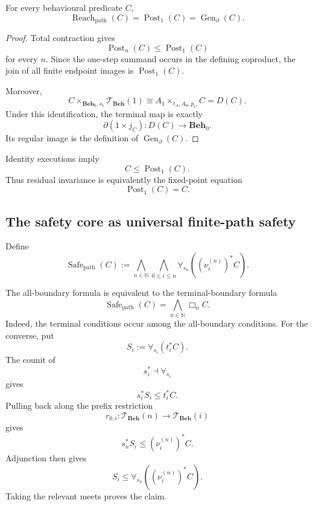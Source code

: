 \begin{theorem}
\label{thm:generated-closure-endpoint-reachability}
For every behavioural predicate \(C\),
\[
    \operatorname{Reach}_{\mathrm{path}}(C)
    =
    \operatorname{Post}_1(C)
    =
    \operatorname{Gen}_{\partial}(C).
\]
\end{theorem}

\begin{proof}
Total contraction gives
\[
    \operatorname{Post}_n(C)
    \leq
    \operatorname{Post}_1(C)
\]
for every \(n\). Since the one-step summand occurs in the defining
coproduct, the join of all finite endpoint images is
\(\operatorname{Post}_1(C)\).

Moreover,
\[
    C\times_{\mathbf{Beh}_0,s_1}
    \mathscr T_{\mathbf{Beh}}(1)
    \cong
    A_1\times_{t_A,A_0,p_C}C
    =
    D(C).
\]
Under this identification, the terminal map is exactly
\[
    \partial(1\times j_C):D(C)\to\mathbf{Beh}_0.
\]
Its regular image is the definition of
\(\operatorname{Gen}_{\partial}(C)\).
\end{proof}

Identity executions imply
\[
    C\leq\operatorname{Post}_1(C).
\]
Thus residual invariance is equivalently the fixed-point equation
\[
    \operatorname{Post}_1(C)=C.
\]

\subsection{The safety core as universal finite-path safety}
\label{subsec:safety-core-universal-finite-path-safety}

Define
\[
    \operatorname{Safe}_{\mathrm{path}}(C)
    :=
    \bigwedge_{n\in\mathbb N}
    \bigwedge_{0\leq i\leq n}
    \forall_{s_n}
    \left(
        (\nu_i^{(n)})^\ast C
    \right).
\]

The all-boundary formula is equivalent to the terminal-boundary formula
\[
    \operatorname{Safe}_{\mathrm{path}}(C)
    =
    \bigwedge_{n\in\mathbb N}
    \Box_nC.
\]
Indeed, the terminal conditions occur among the all-boundary conditions. For
the converse, put
\[
    S_i:=\forall_{s_i}(t_i^\ast C).
\]
The counit of
\[
    s_i^\ast\dashv\forall_{s_i}
\]
gives
\[
    s_i^\ast S_i\leq t_i^\ast C.
\]
Pulling back along the prefix restriction
\[
    r_{0,i}:
    \mathscr T_{\mathbf{Beh}}(n)
    \to
    \mathscr T_{\mathbf{Beh}}(i)
\]
gives
\[
    s_n^\ast S_i
    \leq
    (\nu_i^{(n)})^\ast C.
\]
Adjunction then gives
\[
    S_i
    \leq
    \forall_{s_n}
    \left(
        (\nu_i^{(n)})^\ast C
    \right).
\]
Taking the relevant meets proves the claim.

